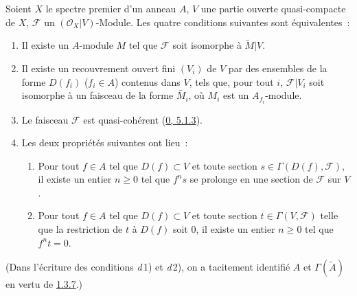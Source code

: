 \begin{theorem}[1.4.1]
\label{I.1.4.1-fr}
Soient $X$ le spectre premier d'un anneau $A$, $V$ une partie ouverte
quasi-compacte de $X$, $\mathscr{F}$ un $(\mathscr{O}_X|V)$-Module. Les
quatre conditions suivantes sont équivalentes~:
\begin{enumerate}
  \item[\textit{a})] Il existe un $A$-module $M$ tel que $\mathscr{F}$ soit
  isomorphe à $\widetilde{M}|V$.
  \item[\textit{b})] Il existe un recouvrement ouvert fini $(V_i)$ de $V$ par des
  ensembles de la forme $D(f_i)$ ($f_i\in A$) contenus dans $V$, tels que,
  pour tout $i$, $\mathscr{F}|V_i$ soit isomorphe à un faisceau de la forme
  $\widetilde{M_i}$, où $M_i$ est un $A_{f_i}$-module.
  \item[\textit{c})] Le faisceau $\mathscr{F}$ est quasi-cohérent
  (\hyperref[0.5.1.3-fr]{0, 5.1.3}).
  \item[\textit{d})] Les deux propriétés suivantes ont lieu~:
  \begin{enumerate}
    \item[\textit{d}\,1)] Pour tout $f\in A$ tel que $D(f)\subset V$ et toute
    section $s\in\Gamma(D(f),\mathscr{F})$, il existe un entier $n\geq0$ tel
    que $f^n s$ se prolonge en une section de $\mathscr{F}$ sur $V$.
    \item[\textit{d}\,2)] Pour tout $f\in A$ tel que $D(f)\subset V$ et toute
    section $t\in\Gamma(V,\mathscr{F})$ telle que la restriction de $t$ à
    $D(f)$ soit $0$, il existe un entier $n\geq0$ tel que $f^n t=0$.
  \end{enumerate}
\end{enumerate}
\end{theorem}

(Dans l'écriture des conditions \textit{d}\,1) et \textit{d}\,2), on a tacitement identifié $A$
et $\Gamma(\widetilde{A})$ en vertu de
\hyperref[I.1.3.7-fr]{1.3.7}.)

